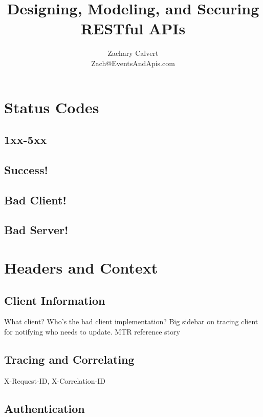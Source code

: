 \documentclass[12pt,oneside]{book} %
\title{Designing, Modeling, and Securing \\ RESTful APIs}
\author{Zachary Calvert \\Zach@EventsAndApis.com }
\begin{document}
\maketitle

\pagestyle{empty}

\frontmatter
\tableofcontents
\clearpage

\clearpage

\pagestyle{plain}



\clearpage
\mainmatter
{}




\chapter{Status Codes}
\section{1xx-5xx}
\section{Success!}
\section{Bad Client!}
\section{Bad Server!}

\chapter{Headers and Context}
\section{Client Information}
What client?  Who's the bad client implementation?
Big sidebar on tracing client for notifying who needs to update.  MTR reference story
\section{Tracing and Correlating}
X-Request-ID, X-Correlation-ID
\section{Authentication}
\end{document}

